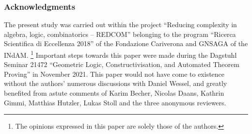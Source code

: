 \documentclass[envcountsect,envcountsame,runningheads]{llncs}
\renewcommand{\_}{\mathpunct{.}\,}
\begin{document}
\subsubsection{Acknowledgments}
The present study was carried out within the project ``Reducing complexity in
algebra, logic, combinatorics -- REDCOM'' belonging to the program ``Ricerca
Scientifica di Eccellenza 2018'' of the Fondazione Cariverona and GNSAGA of the INdAM.%
\footnote{The opinions expressed in this paper are solely those of the
authors.} Important steps towards this paper were made
during the Dagstuhl Seminar 21472 ``Geometric Logic, Constructivisation, and
Automated Theorem Proving'' in November 2021. This paper would not have come to
existence without the authors' numerous discussions with Daniel Wessel, and
greatly benefited from astute comments of Karim Becher, Nicolas Daans, Kathrin Gimmi, Matthias Hutzler,
Lukas Stoll and the three anonymous reviewers.



\end{document}
